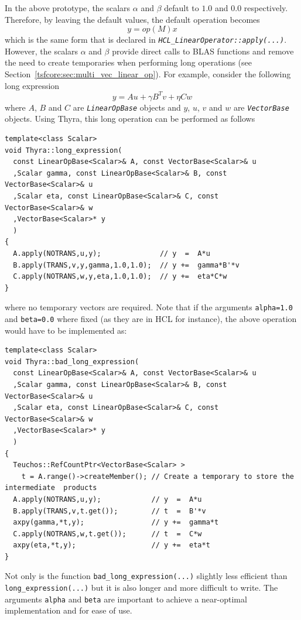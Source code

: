 \documentclass[pdf,ps2pdf,11pt]{SANDreport}
\begin{document}
In the above prototype, the scalars $\alpha$ and $\beta$ default to
$1.0$ and $0.0$ respectively.  Therefore, by leaving the default
values, the default operation becomes
%
\[
y = op(M) x
\]
%
which is the same form that is declared in
{}\texttt{\textit{HCL\-\_Linear\-Operator\-::apply(\-...)}}.  However, the
scalars $\alpha$ and $\beta$ provide direct calls to BLAS functions and remove
the need to create temporaries when performing long operations (see
Section~\ref{tsfcore:sec:multi_vec_linear_op}).  For example, consider the
following long expression
%
\[
y = A u + \gamma B^T v + \eta C w
\]
%
where $A$, $B$ and $C$ are {}\texttt{\textit{Linear\-Op\-Base}} objects and
$y$, $u$, $v$ and $w$ are {}\texttt{\textit{Vector\-Base}} objects.  Using
Thyra, this long operation can be performed as follows

{\scriptsize\begin{verbatim}
template<class Scalar>
void Thyra::long_expression(
  const LinearOpBase<Scalar>& A, const VectorBase<Scalar>& u
  ,Scalar gamma, const LinearOpBase<Scalar>& B, const VectorBase<Scalar>& u
  ,Scalar eta, const LinearOpBase<Scalar>& C, const VectorBase<Scalar>& w
  ,VectorBase<Scalar>* y
  )
{
  A.apply(NOTRANS,u,y);              // y  =  A*u
  B.apply(TRANS,v,y,gamma,1.0,1.0);  // y +=  gamma*B'*v
  C.apply(NOTRANS,w,y,eta,1.0,1.0);  // y +=  eta*C*w
}
\end{verbatim}}

{}\noindent{}where no temporary vectors are required.  Note that if
the arguments {}\texttt{alpha=1.0} and {}\texttt{beta=0.0} where fixed
(as they are in HCL for instance), the above operation would have to
be implemented as:

{\scriptsize\begin{verbatim}
template<class Scalar>
void Thyra::bad_long_expression(
  const LinearOpBase<Scalar>& A, const VectorBase<Scalar>& u
  ,Scalar gamma, const LinearOpBase<Scalar>& B, const VectorBase<Scalar>& u
  ,Scalar eta, const LinearOpBase<Scalar>& C, const VectorBase<Scalar>& w
  ,VectorBase<Scalar>* y
  )
{
  Teuchos::RefCountPtr<VectorBase<Scalar> >
    t = A.range()->createMember(); // Create a temporary to store the intermediate  products
  A.apply(NOTRANS,u,y);            // y  =  A*u
  B.apply(TRANS,v,t.get());        // t  =  B'*v
  axpy(gamma,*t,y);                // y +=  gamma*t
  C.apply(NOTRANS,w,t.get());      // t  =  C*w
  axpy(eta,*t,y);                  // y +=  eta*t
}
\end{verbatim}}

Not only is the function {}\texttt{bad\-\_long\-\_expression(\-...)}
slightly less efficient than {}\texttt{long\-\_expression(\-...)} but
it is also longer and more difficult to write.  The arguments
{}\texttt{alpha} and {}\texttt{beta} are important to achieve a
near-optimal implementation and for ease of use.
\end{document}
